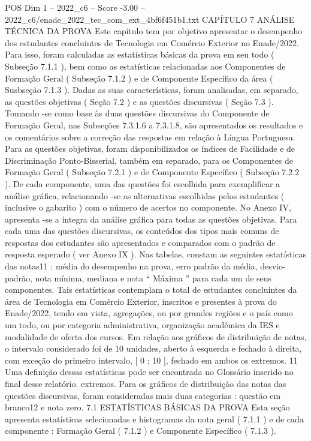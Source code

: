 \begin{textsample}{POS Dim 1 – 2022\_c6 – Score -3.00 – 2022\_c6/enade\_2022\_tec\_com\_ext\_4bf6f451b1.txt}  \label{ex:f1_pos_270}
CAPÍTULO 7 ANÁLISE TÉCNICA DA PROVA Este capítulo tem por objetivo apresentar o desempenho dos estudantes concluintes de Tecnologia em Comércio Exterior no Enade/2022.
Para isso, foram calculadas as estatísticas básicas da prova em seu todo ( Subseção 7.1.1 ), bem como as estatísticas relacionadas aos Componentes de Formação Geral ( Subseção 7.1.2 ) e de Componente Específico da área ( Susbseção 7.1.3 ).
Dadas as suas características, foram analisadas, em separado, as questões objetivas ( Seção 7.2 ) e as questões discursivas ( Seção 7.3 ).
Tomando -se como base às duas questões discursivas do Componente de Formação Geral, nas Subseções 7.3.1.6 a 7.3.1.8, são apresentados os resultados e os comentários sobre a correção das respostas em relação à Língua Portuguesa.
Para as questões objetivas, foram disponibilizados os índices de Facilidade e de Discriminação Ponto-Bisserial, também em separado, para os Componentes de Formação Geral ( Subseção 7.2.1 ) e de Componente Específico ( Subseção 7.2.2 ).
De cada componente, uma das questões foi escolhida para exemplificar a análise gráfica, relacionando -se as alternativas escolhidas pelos estudantes ( inclusive o gabarito ) com o número de acertos no componente.
No Anexo IV, apresenta -se a íntegra da análise gráfica para todas as questões objetivas.
Para cada uma das questões discursivas, os conteúdos dos tipos mais comuns de respostas dos estudantes são apresentados e comparados com o padrão de resposta esperado ( ver Anexo IX ).
Nas tabelas, constam as seguintes estatísticas das notas11 : média do desempenho na prova, erro padrão da média, desvio-padrão, nota mínima, mediana e nota “ Máxima ” para cada um de seus componentes.
Tais estatísticas contemplam o total de estudantes concluintes da área de Tecnologia em Comércio Exterior, inscritos e presentes à prova do Enade/2022, tendo em vista, agregações, ou por grandes regiões e o país como um todo, ou por categoria administrativa, organização acadêmica da IES e modalidade de oferta dos cursos.
Em relação aos gráficos de distribuição de notas, o intervalo considerado foi de 10 unidades, aberto à esquerda e fechado à direita, com exceção do primeiro intervalo, [ 0 ; 10 ], fechado em ambos os extremos. 11 Uma definição dessas estatísticas pode ser encontrada no Glossário inserido no final desse relatório. extremos.
Para os gráficos de distribuição das notas das questões discursivas, foram consideradas mais duas categorias : questão em branco12 e nota zero. 7.1 ESTATÍSTICAS BÁSICAS DA PROVA Esta seção apresenta estatísticas selecionadas e histogramas da nota geral ( 7.1.1 ) e de cada componente : Formação Geral ( 7.1.2 ) e Componente Específico ( 7.1.3 ).

\end{textsample}
